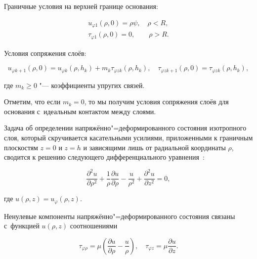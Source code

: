 Граничные условия на верхней границе основания:

\begin{gather}

u_{\varphi 1}(\rho, 0)=\rho \psi,  \quad \rho<R,\label{eq:kov:antvel1}\\

\tau_{\varphi 1}(\rho, 0)=0, \qquad \rho>R.\label{eq:kov:antvel2}

\end{gather}



Условия сопряжения слоёв:

\begin{equation}

u_{\varphi k+1}(\rho, 0)=u_{\varphi k}(\rho,h_{k})+m_{k}\tau_{\varphi zk}(\rho, h_{k}),

\quad 

\tau_{\varphi z k+1}(\rho, 0)=\tau_{\varphi z k}(\rho,h_{k}),

\label{eq:kov:antvel3}

\end{equation}

где $m_{k}\geq 0$ "--- коэффициенты упругих связей. 

Отметим, что если $m_{k}=0$, то мы получим условия сопряжения слоёв для основания с~идеальным контактом между слоями. 

Задача об определении напряжённо"=деформированного состояния изотропного слоя, который скручивается касательными усилиями, приложенными к граничным плоскостям $z=0$ и $z=h$ и зависящими лишь от радиальной координаты $\rho$, сводится к решению следующего дифференциального уравнения~\cite{antvel:bib:Eysh-ru}:

$$

\frac{\partial^{2}u}{\partial \rho^{2}}+\frac{1}{\rho}\frac{\partial

u}{\partial \rho}-\frac{u}{\rho^{2}}+\frac{\partial^{2}u}{\partial

z^{2}}=0,

$$

где $u(\rho, z)=u_{\varphi}(\rho, z)$.



Ненулевые компоненты напряжённо"=деформированного состояния связаны с~функцией $u(\rho,z)$ соотношениями

\begin{equation*}

\tau_{\varphi\rho}=\mu\left(\frac{\partial u}{\partial

\rho}-\frac{u}{\rho}\right),\quad  \tau_{\varphi z}=\mu\frac{\partial u}{\partial z}.

\end{equation*}



